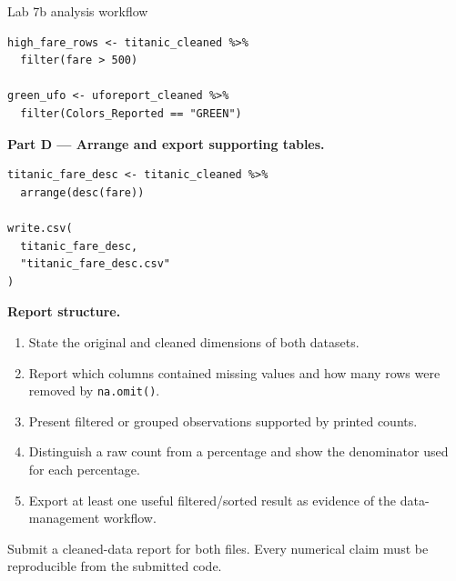 \begin{labproject}{Lab 7b analysis workflow}
\begin{lstlisting}[style=dsr]
high_fare_rows <- titanic_cleaned %>%
  filter(fare > 500)

green_ufo <- uforeport_cleaned %>%
  filter(Colors_Reported == "GREEN")
\end{lstlisting}

\textbf{Part D --- Arrange and export supporting tables.}

\begin{lstlisting}[style=dsr]
titanic_fare_desc <- titanic_cleaned %>%
  arrange(desc(fare))

write.csv(
  titanic_fare_desc,
  "titanic_fare_desc.csv"
)
\end{lstlisting}

\textbf{Report structure.}
\begin{enumerate}
  \item State the original and cleaned dimensions of both datasets.
  \item Report which columns contained missing values and how many rows were removed by \texttt{na.omit()}.
  \item Present filtered or grouped observations supported by printed counts.
  \item Distinguish a raw count from a percentage and show the denominator used for each percentage.
  \item Export at least one useful filtered/sorted result as evidence of the data-management workflow.
\end{enumerate}
\end{labproject}

\begin{labdeliverable}
Submit a cleaned-data report for both files. Every numerical claim must be reproducible from the submitted code.
\end{labdeliverable}
